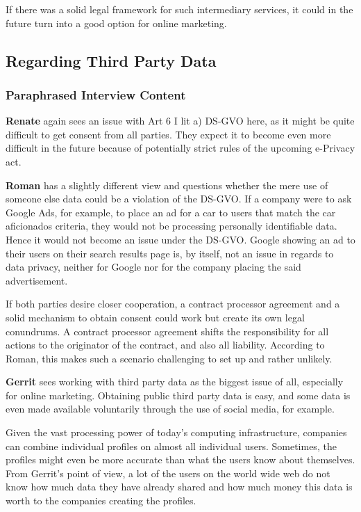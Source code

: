 If there was a solid legal framework for such intermediary services, it could in the future turn into a good option for online marketing.

\subsection{Regarding Third Party Data}

\subsubsection{Paraphrased Interview Content}

\textbf{Renate} again sees an issue with Art 6 I lit a) DS-GVO here, as it might be quite difficult to get consent from all parties. They expect it to become even more difficult in the future because of potentially strict rules of the upcoming e-Privacy act.

\textbf{Roman} has a slightly different view and questions whether the mere use of someone else data could be a violation of the DS-GVO. If a company were to ask Google Ads, for example, to place an ad for a car to users that match the car aficionados criteria, they would not be processing personally identifiable data. Hence it would not become an issue under the DS-GVO. Google showing an ad to their users on their search results page is, by itself, not an issue in regards to data privacy, neither for Google nor for the company placing the said advertisement.

If both parties desire closer cooperation, a contract processor agreement and a solid mechanism to obtain consent could work but create its own legal conundrums. A contract processor agreement shifts the responsibility for all actions to the originator of the contract, and also all liability. According to Roman, this makes such a scenario challenging to set up and rather unlikely.

\textbf{Gerrit} sees working with third party data as the biggest issue of all, especially for online marketing. Obtaining public third party data is easy, and some data is even made available voluntarily through the use of social media, for example.

Given the vast processing power of today's computing infrastructure, companies can combine individual profiles on almost all individual users. Sometimes, the profiles might even be more accurate than what the users know about themselves. From Gerrit's point of view, a lot of the users on the world wide web do not know how much data they have already shared and how much money this data is worth to the companies creating the profiles.

